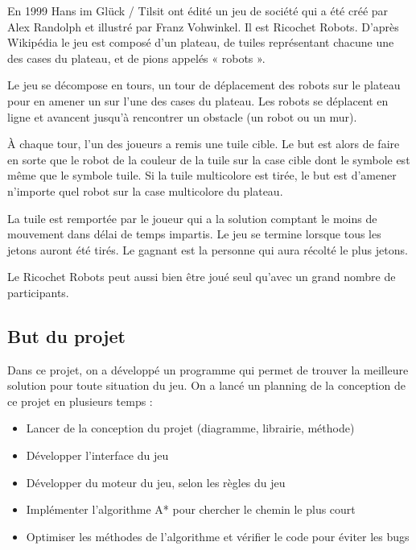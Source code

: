 \documentclass[12pt, pdflatex]{article}
\begin{document}
    En 1999 Hans im Glück / Tilsit ont édité un jeu de société qui a été créé par Alex Randolph et illustré par Franz Vohwinkel. Il est Ricochet Robots. 
    D'après Wikipédia\cite{wiki} le jeu est composé d'un plateau, de tuiles représentant chacune une des cases du plateau, et de pions appelés « robots ». 

    Le jeu se décompose en tours, un tour de déplacement des robots sur le plateau pour en amener un sur l'une des cases du plateau. Les robots se déplacent en ligne et avancent jusqu’à rencontrer un obstacle (un robot ou un mur).

    À chaque tour, l'un des joueurs a remis une tuile cible. Le but est alors de faire en sorte que le robot de la couleur de la tuile sur la case cible dont le symbole est même que le symbole tuile. Si la tuile multicolore est tirée, le but est d'amener n'importe quel robot sur la case multicolore du plateau.
    
    La tuile est remportée par le joueur qui a la solution comptant le moins de mouvement dans délai de temps impartis. Le jeu se termine lorsque tous les jetons auront été tirés. Le gagnant est la personne qui aura récolté le plus jetons.

    Le Ricochet Robots peut aussi bien être joué seul qu’avec un grand nombre de participants.



    \subsection{But du projet}
    Dans ce projet, on a développé un programme qui permet de trouver la meilleure solution pour toute situation du jeu. On a lancé un planning de la conception de ce projet en plusieurs temps :

    \begin{itemize}
        \item Lancer de la conception du projet (diagramme, librairie, méthode)
        \item Développer l'interface du jeu
        \item Développer du moteur du jeu, selon les règles du jeu
        \item Implémenter l'algorithme A* pour chercher le chemin le plus court
        \item Optimiser les méthodes de l'algorithme et vérifier le code pour éviter les bugs
    \end{itemize}

\pagebreak
\end{document}
